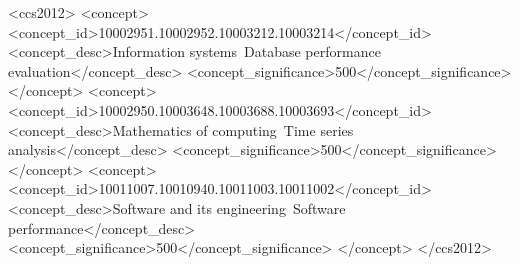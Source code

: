 \documentclass[sigconf]{acmart}
\begin{document}
\begin{CCSXML}
<ccs2012>
   <concept>
       <concept_id>10002951.10002952.10003212.10003214</concept_id>
       <concept_desc>Information systems~Database performance evaluation</concept_desc>
       <concept_significance>500</concept_significance>
       </concept>
   <concept>
       <concept_id>10002950.10003648.10003688.10003693</concept_id>
       <concept_desc>Mathematics of computing~Time series analysis</concept_desc>
       <concept_significance>500</concept_significance>
       </concept>
   <concept>
       <concept_id>10011007.10010940.10011003.10011002</concept_id>
       <concept_desc>Software and its engineering~Software performance</concept_desc>
       <concept_significance>500</concept_significance>
       </concept>
 </ccs2012>
\end{CCSXML}



\maketitle
\end{document}
